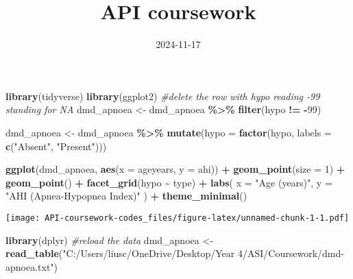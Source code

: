 \documentclass[
]{article}
\title{API coursework}
\author{}
\date{\vspace{-2.5em}2024-11-17}
\newenvironment{Shaded}{\begin{snugshade}}{\end{snugshade}}
\newcommand{\AttributeTok}[1]{\textcolor[rgb]{0.13,0.29,0.53}{#1}}
\newcommand{\CommentTok}[1]{\textcolor[rgb]{0.56,0.35,0.01}{\textit{#1}}}
\newcommand{\DecValTok}[1]{\textcolor[rgb]{0.00,0.00,0.81}{#1}}
\newcommand{\FunctionTok}[1]{\textcolor[rgb]{0.13,0.29,0.53}{\textbf{#1}}}
\newcommand{\NormalTok}[1]{#1}
\newcommand{\OtherTok}[1]{\textcolor[rgb]{0.56,0.35,0.01}{#1}}
\newcommand{\SpecialCharTok}[1]{\textcolor[rgb]{0.81,0.36,0.00}{\textbf{#1}}}
\newcommand{\StringTok}[1]{\textcolor[rgb]{0.31,0.60,0.02}{#1}}
\begin{document}
\maketitle

\begin{Shaded}
\begin{Highlighting}[]
\FunctionTok{library}\NormalTok{(tidyverse)}
\FunctionTok{library}\NormalTok{(ggplot2)}
\CommentTok{\#delete the row with hypo reading {-}99 standing for NA}
\NormalTok{dmd\_apnoea }\OtherTok{\textless{}{-}}\NormalTok{ dmd\_apnoea }\SpecialCharTok{\%\textgreater{}\%}
  \FunctionTok{filter}\NormalTok{(hypo }\SpecialCharTok{!=} \SpecialCharTok{{-}}\DecValTok{99}\NormalTok{)}

\NormalTok{dmd\_apnoea }\OtherTok{\textless{}{-}}\NormalTok{ dmd\_apnoea }\SpecialCharTok{\%\textgreater{}\%}
  \FunctionTok{mutate}\NormalTok{(}\AttributeTok{hypo =} \FunctionTok{factor}\NormalTok{(hypo, }\AttributeTok{labels =} \FunctionTok{c}\NormalTok{(}\StringTok{"Absent"}\NormalTok{, }\StringTok{"Present"}\NormalTok{)))}

\FunctionTok{ggplot}\NormalTok{(dmd\_apnoea, }\FunctionTok{aes}\NormalTok{(}\AttributeTok{x =}\NormalTok{ ageyears, }\AttributeTok{y =}\NormalTok{ ahi)) }\SpecialCharTok{+}
  \FunctionTok{geom\_point}\NormalTok{(}\AttributeTok{size =} \DecValTok{1}\NormalTok{) }\SpecialCharTok{+}
  \FunctionTok{geom\_point}\NormalTok{() }\SpecialCharTok{+}  
  \FunctionTok{facet\_grid}\NormalTok{(hypo }\SpecialCharTok{\textasciitilde{}}\NormalTok{ type) }\SpecialCharTok{+}  
  \FunctionTok{labs}\NormalTok{(}
    \AttributeTok{x =} \StringTok{"Age (years)"}\NormalTok{,}
    \AttributeTok{y =} \StringTok{"AHI (Apnea{-}Hypopnea Index)"}
\NormalTok{  ) }\SpecialCharTok{+}
  \FunctionTok{theme\_minimal}\NormalTok{()}
\end{Highlighting}
\end{Shaded}

\texttt{[image: API-coursework-codes\_files/figure-latex/unnamed-chunk-1-1.pdf]}

\begin{Shaded}
\begin{Highlighting}[]
\FunctionTok{library}\NormalTok{(dplyr)}
\CommentTok{\#reload the data}
\NormalTok{dmd\_apnoea }\OtherTok{\textless{}{-}} \FunctionTok{read\_table}\NormalTok{(}\StringTok{"C:/Users/liusc/OneDrive/Desktop/Year 4/ASI/Coursework/dmd{-}apnoea.txt"}\NormalTok{)}
\end{Highlighting}
\end{Shaded}
\end{document}
